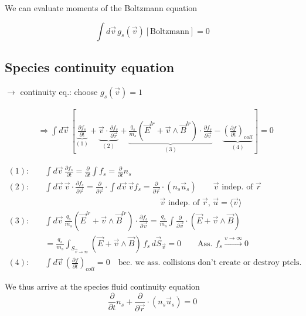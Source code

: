 We can evaluate moments of the Boltzmann equation


\[
\int d\vec{v} \, g_s(\vec{v}) \left[\text{Boltzmann}\right] = 0
\]
\subsection{Species continuity equation}
$\to$ continuity eq.: choose $g_s(\vec{v}) = 1$

\begin{align*}
&\Rightarrow \int d\vec{v} \, \left[\underbrace{\frac{\partial f_s}{\partial t}}_{(1)} + \underbrace{\vec{v} \cdot \frac{\partial f_s}{\partial \vec{r}}}_{(2)} + \underbrace{\frac{q_s}{m_s} (\vec{E}^{lr} + \vec{v} \wedge \vec{B}^{lr}) \cdot \frac{\partial f_s}{\partial \vec{v}}}_{(3)} - \underbrace{\left(\frac{\partial f}{\partial t}\right)_{coll}}_{(4)}\right] = 0
\end{align*}

\begin{align*}
(1): \quad & \int d\vec{v} \,  \frac{\partial f_s}{\partial t} = \frac{\partial}{\partial t} \int f_s = \frac{\partial}{\partial t} n_s \\
(2): \quad & \int d\vec{v} \,  \vec{v} \cdot \frac{\partial f_s}{\partial \vec{r}} = \frac{\partial}{\partial \vec{r}} \cdot \int d\vec{v} \, \vec{v} f_s = \frac{\partial}{\partial \vec{r}} \cdot (n_s \vec{u}_s) \qquad \text{$\vec{v}$ indep. of $\vec{r}$} \\
& \qquad \qquad \qquad \qquad \qquad \qquad \qquad \text{$\vec{v}$ indep. of $\vec{r}$, $\vec{u} = \langle \vec{v} \rangle$} \\
(3): \quad & \int d\vec{v} \,  \frac{q_s}{m_s} (\vec{E}^{lr} + \vec{v} \wedge \vec{B}^{lr}) \cdot \frac{\partial f_s}{\partial \vec{v}} = \frac{q_s}{m_s} \int \frac{\partial}{\partial \vec{v}} \cdot (\vec{E} + \vec{v} \wedge \vec{B}) \\
& = \frac{q_s}{m_s} \int_{S_{\vec{v} \to \infty}} (\vec{E} + \vec{v} \wedge \vec{B}) \, f_s \, d\vec{S}_{\vec{v}} = 0 \qquad\text{Ass. } f_s\overset{v\to\infty}{\rightarrow}0\\
(4): \quad & \int d\vec{v} \,  \left(\frac{\partial f}{\partial t}\right)_{coll} = 0 \quad \text{bec. we ass. collisions don't create or destroy ptcls.}
\end{align*}

We thus arrive at the species fluid continuity equation
\begin{equation}
    \frac{\partial}{\partial t} n_s + \frac{\partial}{\partial \vec{r}} \cdot (n_s \vec{u}_s) = 0
\end{equation}



